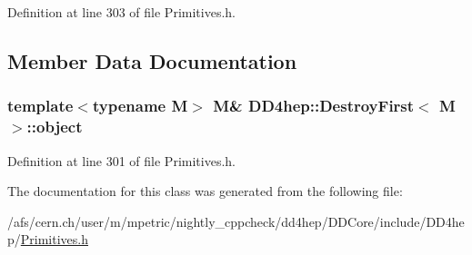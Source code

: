 Definition at line 303 of file Primitives.h.

\subsection{Member Data Documentation}
\hypertarget{class_d_d4hep_1_1_destroy_first_a18b46ba57a4b4115bbfd3774f8632ea1}{
\subsubsection[{object}]{\setlength{\rightskip}{0pt plus 5cm}template$<$typename M$>$ M\& {\bf DD4hep::DestroyFirst}$<$ M $>$::{\bf object}}}
\label{class_d_d4hep_1_1_destroy_first_a18b46ba57a4b4115bbfd3774f8632ea1}


Definition at line 301 of file Primitives.h.

The documentation for this class was generated from the following file:\begin{DoxyCompactItemize}
\item 
/afs/cern.ch/user/m/mpetric/nightly\_\-cppcheck/dd4hep/DDCore/include/DD4hep/\hyperlink{_primitives_8h}{Primitives.h}\end{DoxyCompactItemize}
